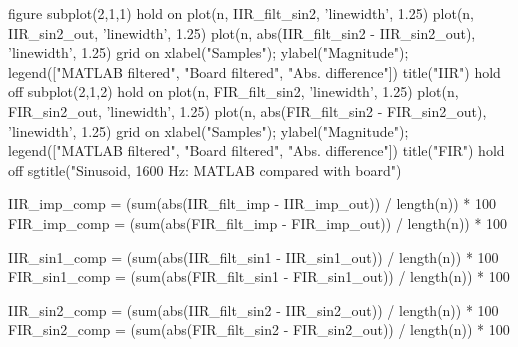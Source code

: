 \documentclass{bannerReport}
\begin{document}
\begin{code}
figure
subplot(2,1,1)
hold on
	plot(n, IIR_filt_sin2, 'linewidth', 1.25)
	plot(n, IIR_sin2_out, 'linewidth', 1.25)
	plot(n, abs(IIR_filt_sin2 - IIR_sin2_out), 'linewidth', 1.25)
	grid on
	xlabel("Samples");
	ylabel("Magnitude");
	legend(["MATLAB filtered", "Board filtered", "Abs. difference"])
	title("IIR")
hold off
subplot(2,1,2)
hold on
	plot(n, FIR_filt_sin2, 'linewidth', 1.25)
	plot(n, FIR_sin2_out, 'linewidth', 1.25)
	plot(n, abs(FIR_filt_sin2 - FIR_sin2_out), 'linewidth', 1.25)
	grid on
	xlabel("Samples");
	ylabel("Magnitude");
	legend(["MATLAB filtered", "Board filtered", "Abs. difference"])
	title("FIR")
hold off
sgtitle("Sinusoid, 1600 Hz: MATLAB compared with board")


IIR_imp_comp = (sum(abs(IIR_filt_imp - IIR_imp_out)) / length(n)) * 100
FIR_imp_comp = (sum(abs(FIR_filt_imp - FIR_imp_out)) / length(n)) * 100

IIR_sin1_comp = (sum(abs(IIR_filt_sin1 - IIR_sin1_out)) / length(n)) * 100
FIR_sin1_comp = (sum(abs(FIR_filt_sin1 - FIR_sin1_out)) / length(n)) * 100

IIR_sin2_comp = (sum(abs(IIR_filt_sin2 - IIR_sin2_out)) / length(n)) * 100
FIR_sin2_comp = (sum(abs(FIR_filt_sin2 - FIR_sin2_out)) / length(n)) * 100
		\end{code}
\end{document}
